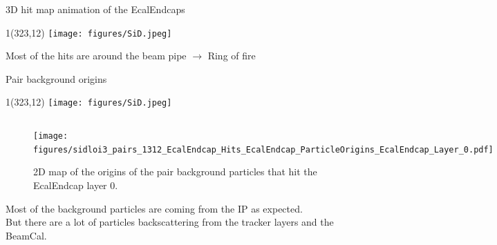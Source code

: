 \documentclass[xcolor={dvipsnames}]{beamer}
\newcommand{\sidlogo}{
  \setlength{\TPHorizModule}{1pt}
  \setlength{\TPVertModule}{1pt}
  \begin{textblock}{1}(323,12)
   \texttt{[image: figures/SiD.jpeg]}
  \end{textblock}
  }
\begin{document}
\begin{frame}[t]{3D hit map animation of the EcalEndcaps}
\sidlogo
\begin{center}
\end{center}
Most of the hits are around the beam pipe $\rightarrow$ Ring of fire
\end{frame}

\begin{frame}{Pair background origins}
\sidlogo
  \begin{figure}
 	\begin{columns}
        \begin{flushright}
        \texttt{[image: figures/sidloi3\_pairs\_1312\_EcalEndcap\_Hits\_EcalEndcap\_ParticleOrigins\_EcalEndcap\_Layer\_0.pdf]}
        \end{flushright}
        \begin{flushleft}
	\caption{\small 2D map of the origins of the pair background particles that hit the EcalEndcap layer 0.}
        \end{flushleft}
      \end{columns}
\end{figure}

Most of the background particles are coming from the IP as expected.\\
But there are a lot of particles backscattering from the tracker layers and the BeamCal.
\end{frame}
\end{document}
